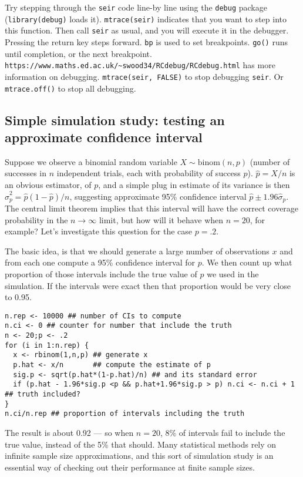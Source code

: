\documentclass[10pt] {article}
\theoremstyle{definition}
\begin{document}
 Try stepping through the {\tt seir} code line-by line using the {\tt debug} package (\lstinline+library(debug)+ loads it). \lstinline+mtrace(seir)+ indicates that you want to step into this function. Then call {\tt seir} as usual, and you will execute it in the debugger. Pressing the return key steps forward. {\tt bp} is used to set breakpoints. {\tt go()} runs until completion, or the next breakpoint. 
\lstinline+https://www.maths.ed.ac.uk/~swood34/RCdebug/RCdebug.html+ has more information on debugging. \lstinline+mtrace(seir, FALSE)+ to stop debugging {\tt seir}. Or \lstinline+mtrace.off()+ to stop all debugging.

\subsection{Simple simulation study: testing an approximate confidence interval}

Suppose we observe a binomial random variable $X \sim \text{binom}(n,p)$ (number of successes in $n$ independent trials, each with probability of success $p$). $\hat p = X/n$ is an obvious estimator, of $p$, and a simple plug in estimate of its variance is then $\hat \sigma^2_p = \hat p (1-\hat p)/n$, suggesting approximate 95\% confidence interval $\hat p \pm 1.96 \hat \sigma_p$. The central limit theorem implies that this interval will have the correct coverage probability in the $n \to \infty$ limit, but how will it behave when $n=20$, for example? Let's investigate this question for the case $p=.2$. 
  
The basic idea, is that we should generate a large number of observations $x$ and from each one compute a 95\% confidence interval for $p$. We then count up what proportion of those intervals include the true value of $p$ we used in the simulation. If the intervals were exact then that proportion would be very close to 0.95.

\begin{lstlisting}
n.rep <- 10000 ## number of CIs to compute 
n.ci <- 0 ## counter for number that include the truth 
n <- 20;p <- .2
for (i in 1:n.rep) { 
  x <- rbinom(1,n,p) ## generate x
  p.hat <- x/n       ## compute the estimate of p
  sig.p <- sqrt(p.hat*(1-p.hat)/n) ## and its standard error
  if (p.hat - 1.96*sig.p <p && p.hat+1.96*sig.p > p) n.ci <- n.ci + 1 ## truth included?
}
n.ci/n.rep ## proportion of intervals including the truth
\end{lstlisting}
The result is about 0.92 --- so when $n=20$, 8\% of intervals fail to include the true value, instead of the 5\% that should. Many statistical methods rely on infinite sample size approximations, and this sort of simulation study is an essential way of checking out their performance at finite sample sizes.
\end{document}
